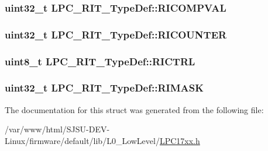 \subsubsection[{\texorpdfstring{R\+I\+C\+O\+M\+P\+V\+AL}{RICOMPVAL}}]{ uint32\+\_\+t L\+P\+C\+\_\+\+R\+I\+T\+\_\+\+Type\+Def\+::\+R\+I\+C\+O\+M\+P\+V\+AL}\hypertarget{structLPC__RIT__TypeDef_a61935034ac2503ec1803464a6007e931}{}\label{structLPC__RIT__TypeDef_a61935034ac2503ec1803464a6007e931}
\subsubsection[{\texorpdfstring{R\+I\+C\+O\+U\+N\+T\+ER}{RICOUNTER}}]{ uint32\+\_\+t L\+P\+C\+\_\+\+R\+I\+T\+\_\+\+Type\+Def\+::\+R\+I\+C\+O\+U\+N\+T\+ER}\hypertarget{structLPC__RIT__TypeDef_a56336b32d9afb119f8071e80c1dd754f}{}\label{structLPC__RIT__TypeDef_a56336b32d9afb119f8071e80c1dd754f}
\subsubsection[{\texorpdfstring{R\+I\+C\+T\+RL}{RICTRL}}]{ uint8\+\_\+t L\+P\+C\+\_\+\+R\+I\+T\+\_\+\+Type\+Def\+::\+R\+I\+C\+T\+RL}\hypertarget{structLPC__RIT__TypeDef_a37145567c6963158ef90fb929b1b139c}{}\label{structLPC__RIT__TypeDef_a37145567c6963158ef90fb929b1b139c}
\subsubsection[{\texorpdfstring{R\+I\+M\+A\+SK}{RIMASK}}]{ uint32\+\_\+t L\+P\+C\+\_\+\+R\+I\+T\+\_\+\+Type\+Def\+::\+R\+I\+M\+A\+SK}\hypertarget{structLPC__RIT__TypeDef_aae32ee454d1d50e89f7c2b115f81c006}{}\label{structLPC__RIT__TypeDef_aae32ee454d1d50e89f7c2b115f81c006}


The documentation for this struct was generated from the following file\+:\begin{DoxyCompactItemize}
\item 
/var/www/html/\+S\+J\+S\+U-\/\+D\+E\+V-\/\+Linux/firmware/default/lib/\+L0\+\_\+\+Low\+Level/\hyperlink{LPC17xx_8h}{L\+P\+C17xx.\+h}\end{DoxyCompactItemize}
